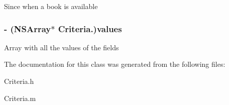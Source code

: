 \label{interface_criteria_a9d2c4c96b4c91226f0d0aac9bce08a4f}
Since when a book is available \hypertarget{interface_criteria_a7278bbc86d128209a3661199fc61ffd9}{
\subsubsection[{values}]{\setlength{\rightskip}{0pt plus 5cm}-\/ (NSArray$\ast$ Criteria.)values}}
\label{interface_criteria_a7278bbc86d128209a3661199fc61ffd9}
Array with all the values of the fields 

The documentation for this class was generated from the following files:\begin{DoxyCompactItemize}
\item 
Criteria.h\item 
Criteria.m\end{DoxyCompactItemize}
